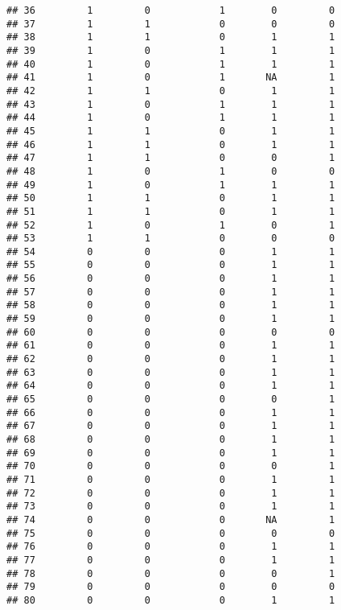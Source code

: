 \documentclass[
]{article}
\begin{document}
\begin{verbatim}
## 36         1         0            1        0         0
## 37         1         1            0        0         0
## 38         1         1            0        1         1
## 39         1         0            1        1         1
## 40         1         0            1        1         1
## 41         1         0            1       NA         1
## 42         1         1            0        1         1
## 43         1         0            1        1         1
## 44         1         0            1        1         1
## 45         1         1            0        1         1
## 46         1         1            0        1         1
## 47         1         1            0        0         1
## 48         1         0            1        0         0
## 49         1         0            1        1         1
## 50         1         1            0        1         1
## 51         1         1            0        1         1
## 52         1         0            1        0         1
## 53         1         1            0        0         0
## 54         0         0            0        1         1
## 55         0         0            0        1         1
## 56         0         0            0        1         1
## 57         0         0            0        1         1
## 58         0         0            0        1         1
## 59         0         0            0        1         1
## 60         0         0            0        0         0
## 61         0         0            0        1         1
## 62         0         0            0        1         1
## 63         0         0            0        1         1
## 64         0         0            0        1         1
## 65         0         0            0        0         1
## 66         0         0            0        1         1
## 67         0         0            0        1         1
## 68         0         0            0        1         1
## 69         0         0            0        1         1
## 70         0         0            0        0         1
## 71         0         0            0        1         1
## 72         0         0            0        1         1
## 73         0         0            0        1         1
## 74         0         0            0       NA         1
## 75         0         0            0        0         0
## 76         0         0            0        1         1
## 77         0         0            0        1         1
## 78         0         0            0        0         1
## 79         0         0            0        0         0
## 80         0         0            0        1         1

\end{verbatim}
\end{document}
